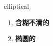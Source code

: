 
\begin{frame}
{\huge elliptical}
\begin{center}
\begin{enumerate}\Large
  \item \textbf{含糊不清的}
  \item \textbf{椭圆的}
\end{enumerate}
\end{center}
\end{frame}
